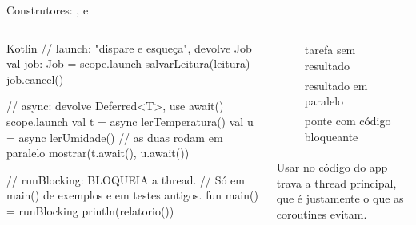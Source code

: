 \documentclass[aspectratio=169,10pt]{beamer}
\begin{document}
\begin{frame}[fragile]{Construtores: ,  e }
  \begin{columns}[T]
    \begin{column}{0.52\textwidth}
\begin{codigo}[title=Iniciando coroutines]{Kotlin}
// launch: "dispare e esqueça", devolve Job
val job: Job = scope.launch {
  salvarLeitura(leitura)
}
job.cancel()

// async: devolve Deferred<T>, use await()
scope.launch {
  val t = async { lerTemperatura() }
  val u = async { lerUmidade() }
  // as duas rodam em paralelo
  mostrar(t.await(), u.await())
}

// runBlocking: BLOQUEIA a thread.
// Só em main() de exemplos e em testes antigos.
fun main() = runBlocking {
  println(relatorio())
}
\end{codigo}
    \end{column}
    \begin{column}{0.46\textwidth}
      \footnotesize
      \begin{tabularx}{\linewidth}{@{}l l L@{}}
        \toprule
         &  &  \\
        \midrule
         &  & tarefa sem resultado \\
         &  & resultado em paralelo \\
         &  & ponte com código bloqueante \\
        \bottomrule
      \end{tabularx}
      \begin{erro}
        Usar  no código do app trava a thread principal, que é justamente o que as coroutines evitam.
      \end{erro}
    \end{column}
  \end{columns}
\end{frame}
\end{document}

